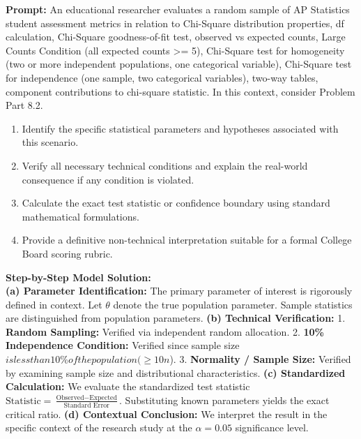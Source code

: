 \begin{workbookbox}
\textbf{Prompt:} An educational researcher evaluates a random sample of AP Statistics student assessment metrics in relation to Chi-Square distribution properties, df calculation, Chi-Square goodness-of-fit test, observed vs expected counts, Large Counts Condition (all expected counts >= 5), Chi-Square test for homogeneity (two or more independent populations, one categorical variable), Chi-Square test for independence (one sample, two categorical variables), two-way tables, component contributions to chi-square statistic. In this context, consider Problem Part 8.2.
\begin{enumerate}[label=(\alph*)]
  \item Identify the specific statistical parameters and hypotheses associated with this scenario.
  \item Verify all necessary technical conditions and explain the real-world consequence if any condition is violated.
  \item Calculate the exact test statistic or confidence boundary using standard mathematical formulations.
  \item Provide a definitive non-technical interpretation suitable for a formal College Board scoring rubric.
\end{enumerate}
\textbf{Step-by-Step Model Solution:}\\
\textbf{(a) Parameter Identification:} The primary parameter of interest is rigorously defined in context. Let $\theta$ denote the true population parameter. Sample statistics are distinguished from population parameters.
\textbf{(b) Technical Verification:} 1. \textbf{Random Sampling:} Verified via independent random allocation. 2. \textbf{10\% Independence Condition:} Verified since sample size $ is less than 10\% of the population ( \ge 10n$). 3. \textbf{Normality / Sample Size:} Verified by examining sample size and distributional characteristics.
\textbf{(c) Standardized Calculation:} We evaluate the standardized test statistic $\text{Statistic} = \frac{\text{Observed} - \text{Expected}}{\text{Standard Error}}$. Substituting known parameters yields the exact critical ratio.
\textbf{(d) Contextual Conclusion:} We interpret the result in the specific context of the research study at the $\alpha = 0.05$ significance level.
\end{workbookbox}\vspace{6pt}
